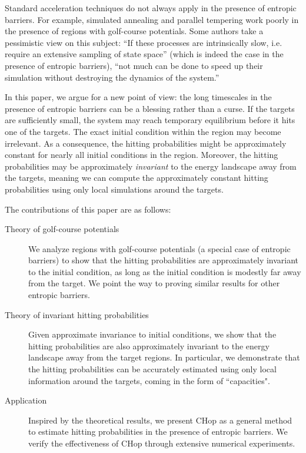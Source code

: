 \documentclass[english, aip, jcp, priprint, graphicx,floatfix]{revtex4-1}
\theoremstyle{plain}
\theoremstyle{definition}
\theoremstyle{plain}
\begin{document}
Standard acceleration techniques do not always apply in the presence of entropic barriers.  For example, simulated annealing and parallel tempering work poorly in the presence of regions with golf-course potentials.\cite{Baum1986-we, Wille1987-tf, Machta2009-gh} Some authors take a pessimistic view on this subject: ``If these processes are intrinsically slow, i.e. require an extensive sampling of state space'' (which is indeed the case in the presence of entropic barriers), ``not much can be done to speed up their simulation without destroying the dynamics of the system.''\cite{Christen2008-ge}

In this paper, we argue for a new point of view: the long timescales in the presence of entropic barriers can be a blessing rather than a curse.  If the targets are sufficiently small, the system may reach temporary equilibrium before it hits one of the targets. The exact initial condition within the region may become irrelevant. As a consequence, the hitting probabilities might be approximately constant for nearly all initial conditions in the region.  Moreover, the hitting probabilities may be approximately \emph{invariant} to the energy landscape away from the targets, meaning we can compute the approximately constant hitting probabilities using only local simulations around the targets.

The contributions of this paper are as follows: 

\begin{description}
	\item[Theory of golf-course potentials] We analyze regions with golf-course potentials (a special case of entropic barriers) to show that the hitting probabilities are approximately invariant to the initial condition, as long as the initial condition is modestly far away from the target. We point the way to proving similar results for other entropic barriers.
	\item[Theory of invariant hitting probabilities] Given approximate invariance to initial conditions, we show that the hitting probabilities are also approximately invariant to the energy landscape away from the target regions. In particular, we demonstrate that the hitting probabilities can be accurately estimated using only local information around the targets, coming in the form of ``capacities".
	\item[Application] Inspired by the theoretical results, we present CHop as a general method to estimate hitting probabilities in the presence of entropic barriers. We verify the effectiveness of CHop through extensive numerical experiments.
\end{description}
\end{document}
